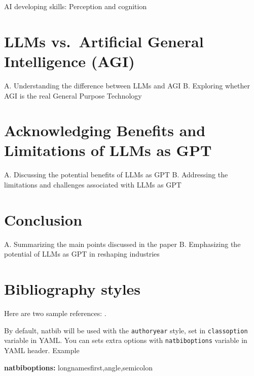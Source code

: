 \documentclass[preprint, 3p,
authoryear]{elsarticle} %
\newenvironment{Shaded}{\begin{snugshade}}{\end{snugshade}}
\newcommand{\AttributeTok}[1]{\textcolor[rgb]{0.13,0.29,0.53}{#1}}
\newcommand{\FunctionTok}[1]{\textcolor[rgb]{0.13,0.29,0.53}{\textbf{#1}}}
\newcommand{\KeywordTok}[1]{\textcolor[rgb]{0.13,0.29,0.53}{\textbf{#1}}}
\begin{document}
AI developing skills: Perception and cognition

\hypertarget{llms-vs.-artificial-general-intelligence-agi}{%
\section{LLMs vs.~Artificial General Intelligence
(AGI)}\label{llms-vs.-artificial-general-intelligence-agi}}

A. Understanding the difference between LLMs and AGI B. Exploring
whether AGI is the real General Purpose Technology

\hypertarget{acknowledging-benefits-and-limitations-of-llms-as-gpt}{%
\section{Acknowledging Benefits and Limitations of LLMs as
GPT}\label{acknowledging-benefits-and-limitations-of-llms-as-gpt}}

A. Discussing the potential benefits of LLMs as GPT B. Addressing the
limitations and challenges associated with LLMs as GPT

\hypertarget{conclusion}{%
\section{Conclusion}\label{conclusion}}

A. Summarizing the main points discussed in the paper B. Emphasizing the
potential of LLMs as GPT in reshaping industries

\hypertarget{bibliography-styles}{%
\section{Bibliography styles}\label{bibliography-styles}}

Here are two sample references: \citeauthor{Feynman1963118}
\citetext{\citeyear{Feynman1963118}; \citealp{Dirac1953888}}.

By default, natbib will be used with the \texttt{authoryear} style, set
in \texttt{classoption} variable in YAML. You can sets extra options
with \texttt{natbiboptions} variable in YAML header. Example

\begin{Shaded}
\begin{Highlighting}[]
\FunctionTok{natbiboptions}\KeywordTok{:}\AttributeTok{ longnamesfirst,angle,semicolon}
\end{Highlighting}
\end{Shaded}
\end{document}
